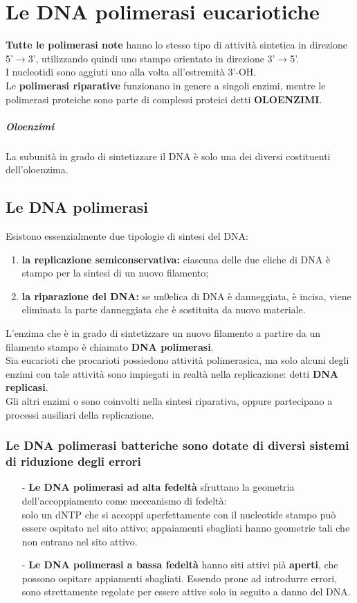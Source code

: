 \documentclass{article}
\begin{document}
\section{Le DNA polimerasi eucariotiche}
\textbf{Tutte le polimerasi note} hanno lo stesso tipo di attività sintetica in direzione 5'$\rightarrow$3', utilizzando quindi uno stampo orientato in direzione 3'$\rightarrow$5'.\\
I nucleotidi sono aggiuti uno alla volta all'estremità 3'-OH.\\
Le \textbf{polimerasi riparative} funzionano in genere a singoli enzimi, mentre le polimerasi proteiche sono parte di complessi proteici detti \textbf{OLOENZIMI}.
\subparagraph{Oloenzimi} La subunità in grado di sintetizzare il DNA è solo una dei diversi costituenti dell'oloenzima.
\subsection{Le DNA polimerasi} Esistono essenzialmente due tipologie di sintesi del DNA:
\begin{enumerate}
    \item \textbf{la replicazione semiconservativa:} ciascuna delle due eliche di DNA è stampo per la sintesi di un nuovo filamento;
    \item \textbf{la riparazione del DNA:} se un0elica di DNA è danneggiata, è incisa, viene eliminata la parte danneggiata che è sostituita da nuovo materiale.
\end{enumerate}
L'enzima che è in grado di sintetizzare un nuovo filamento a partire da un filamento stampo è chiamato \textbf{DNA polimerasi}.\\
Sia eucarioti che procarioti possiedono attività polimerasica, ma solo alcuni degli enzimi con tale attività sono impiegati in realtà nella replicazione: detti \textbf{DNA replicasi}.\\
Gli altri enzimi o sono coinvolti nella sintesi riparativa, oppure partecipano a processi ausiliari della replicazione.
\subsubsection{Le DNA polimerasi batteriche sono dotate di diversi sistemi di riduzione degli errori} 
\begin{itemize}
    \item [-] \textbf{Le DNA polimerasi ad alta fedeltà} sfruttano la geometria dell'accoppiamento come meccanismo di fedeltà:\\
    solo un dNTP che si accoppi aperfettamente con il nucleotide stampo può essere ospitato nel sito attivo; appaiamenti sbagliati hanno geometrie tali che non entrano nel sito attivo.
    \item [-] \textbf{Le DNA polimerasi a bassa fedeltà} hanno siti attivi pià \textbf{aperti}, che possono ospitare appiamenti sbagliati. Essendo prone ad introdurre errori, sono strettamente regolate per essere attive solo in seguito a danno del DNA.
\end{itemize}
\end{document}

